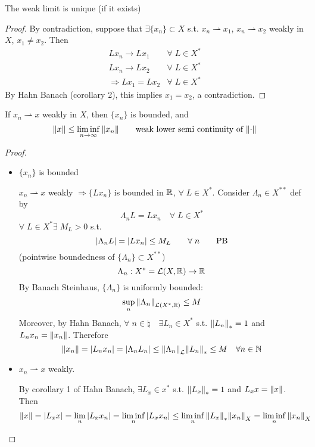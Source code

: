 \begin{proposition}
    The weak limit is unique (if it exists)
\end{proposition}
\begin{proof}
    By contradiction, suppose that \(\exists \{ x_n\} \subset X\) s.t. \(x_n \rightharpoonup x_1\), \(x_n \rightharpoonup x_2\) weakly in \(X\), \(x_1 \neq x_2\). Then
    \[
        \begin{array}{lc}
            Lx_n \to Lx_1 & \forall\; L \in X^* \\
            Lx_n \to L x_2 & \forall\; L \in X^* \\
            \Rightarrow Lx_1 = Lx_2 & \forall\; L \in X^*
    \end{array} 
    \] 
    By Hahn Banach (corollary 2), this implies \(x_1 = x_2\), a contradiction.
\end{proof}

\begin{proposition}
    If \(x_n \rightharpoonup x\) weakly in \(X\), then \(\{x_n\}\) is bounded, and 
    \[
        \norm{x} \leq \liminf_{n \to \infty} \norm{x_n} \tag*{weak lower semi continuity of \(\normdot\)}
    \]
\end{proposition}
\begin{proof}
    \begin{itemize}
        \item \(\{x_n\}\) is bounded
        
        \(x_n \rightharpoonup x\) weakly \(\Rightarrow \{L x_n\}\) is bounded in \(\mathbb{R}\), \(\forall \; L \in X^*\). Consider \(\Lambda_n \in X^{**}\) def by 
        \[
            \Lambda_n L = L x_n \quad \forall\; L \in X^{*}
        \]
        \(\forall\; L \in X^* \exists\; M_L >0 \) s.t.
        \[
            \abs{\Lambda_n L} = \abs{L x_n } \leq M_L \qquad \forall\; n \tag*{PB}
        \]
        (pointwise boundedness of \(\{\Lambda_n \} \subset X^{**}\))
        \[
            \Lambda_n: X^{*}= \mathcal{L}(X, \mathbb{R}) \to \mathbb{R}    
        \]
        By Banach Steinhaus, \(\{\Lambda_n\}\) is uniformly bounded:
        \[
            \sup_n \norm{ \Lambda_n}_{\mathcal{L}(X^*, \mathbb{R})} \leq M
        \]
        Moreover, by Hahn Banach, \(\forall \; n \in \natural \quad \exists L_n \in X^*\) s.t. \(\norm{L_n}_* = 1 \) and \(L_n x_n = \norm{x_n}\). Therefore
        \[
            \norm{x_n} = \abs{L_n x_n} = \abs{\Lambda_n L_n} \leq \norm{\Lambda_n}_\mathcal{L} \norm{L_n}_* \leq M \quad \forall n \in \mathbb{N}
        \] 
        \item \(x_n \rightharpoonup x\) weakly. 
        
        By corollary 1 of Hahn Banach, \(\exists L_x \in x^*\) s.t. \(\norm{L_x}_* = 1\) and \(L_x x = \norm{x}\). Then
        \[
            \norm{x} = \abs{L_x x} = \lim_n \abs{L_x x_n} = \liminf_n \abs{L_x x_n} \leq \liminf_n \norm{L_x}_* \norm{x_n }_X = \liminf_n \norm{x_n }_X
        \]    
    \end{itemize}
\end{proof}

